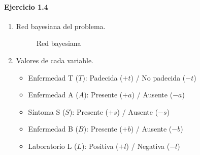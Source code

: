 \documentclass[12pt,a4paper]{article}
\begin{document}
\paragraph{Ejercicio 1.4}
\begin{enumerate}
    \item Red bayesiana del problema.
    
    \begin{figure}[h!]
        \centering
        \caption{Red bayesiana}
    \end{figure}

    \item Valores de cada variable.
    \begin{itemize}
        \item Enfermedad T ($T$): Padecida ($+t$) / No padecida ($-t$)
        \item Enfermedad A ($A$): Presente ($+a$) / Ausente ($-a$)
        \item Síntoma S ($S$): Presente ($+s$) / Ausente ($-s$)
        \item Enfermedad B ($B$): Presente ($+b$) / Ausente ($-b$)
        \item Laboratorio L ($L$): Positiva ($+l$) / Negativa ($-l$)
    \end{itemize}
\end{enumerate}
\end{document}
